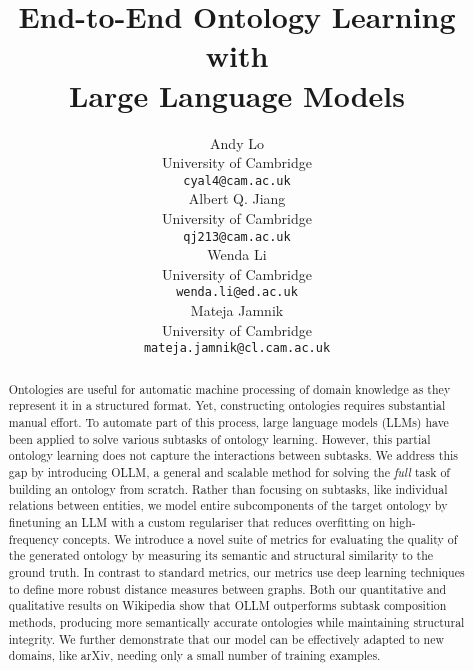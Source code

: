 \documentclass{article}
\title{End-to-End Ontology Learning with \\Large Language Models}
\author{%
    Andy Lo \\
    University of Cambridge\\
    \texttt{cyal4@cam.ac.uk} \\
    Albert Q. Jiang \\
    University of Cambridge\\
    \texttt{qj213@cam.ac.uk} \\
    Wenda Li \\
    University of Cambridge\\
    \texttt{wenda.li@ed.ac.uk} \\
    Mateja Jamnik \\
    University of Cambridge\\
    \texttt{mateja.jamnik@cl.cam.ac.uk} \\
}
\newcommand{\name}{{OLLM}\xspace}
\begin{document}
\maketitle

\begin{abstract}
    Ontologies are useful for automatic machine processing of domain knowledge as they represent it in a structured format.
    Yet, constructing ontologies requires substantial manual effort. To automate part of this process, large language models (LLMs) have been applied to solve various subtasks of ontology learning. However, this partial ontology learning does not capture the interactions between subtasks.
    We address this gap by introducing \name, a general and scalable method for solving the \emph{full} task of building an ontology from scratch.
    Rather than focusing on subtasks, like individual relations between entities, we model entire subcomponents of the target ontology by finetuning an LLM with a custom regulariser that reduces overfitting on high-frequency concepts. We introduce a novel suite of metrics for evaluating the quality of the generated ontology by measuring its semantic and structural similarity to the ground truth. In contrast to standard metrics, our metrics use deep learning techniques to define more robust distance measures between graphs.
    Both our quantitative and qualitative results on Wikipedia show that \name outperforms subtask composition methods, producing more semantically accurate ontologies while maintaining structural integrity. We further demonstrate that our model can be effectively adapted to new domains, like arXiv, needing only a small number of training examples.
\end{abstract}

\end{document}
